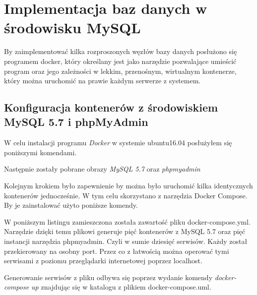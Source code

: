 \chapter{Implementacja baz danych w środowisku MySQL}

By zaimplementować kilka rozproszonych węzłów bazy danych posłużono się programem docker, który określany jest jako narzędzie pozwalające umieścić program oraz jego zależności w lekkim, przenośnym, wirtualnym kontenerze, który można uruchomić na prawie każdym serwerze z systemem. 

\section{Konfiguracja kontenerów z środowiskiem MySQL 5.7 i phpMyAdmin}
W celu instalacji programu \textit{Docker} w systemie ubuntu16.04 posłużyłem się poniższymi komendami.

\lssetdef


Następnie zostały pobrane obrazy \textit{MySQL 5.7} oraz \textit{phpmyadmin}

\lssetdef


Kolejnym krokiem było zapewnienie by można było uruchomić kilka identycznych kontenerów jednocześnie. W tym celu skorzystano z narzędzia Docker Compose. By je zainstalować użyto poniższe komendy.

\lssetdef


W poniższym listingu zamieszczona została zawartość pliku docker-compose.yml. Narzędzie dzięki temu plikowi generuje pięć kontenerów z MySQL 5.7 oraz pięć instancji narzędzia phpmyadmin. Czyli w sumie dziesięć serwisów. Każdy został przekierowany na osobny port. Przez co z łatwością można operować tymi serwisami z poziomu przeglądarki internetowej poprzez localhost.

\lssetdef


Generowanie serwisów z pliku odbywa się poprzez wydanie komendy \textit{docker-compose up} znajdując się w katalogu z plikiem docker-compose.uml.

